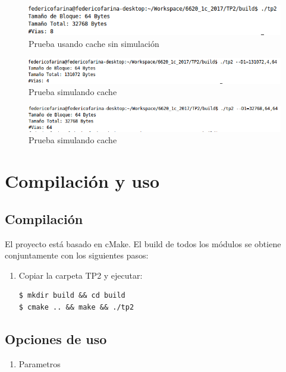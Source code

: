 \documentclass[a4paper,10pt]{article}
\begin{document}
\begin{figure}[h!]
	\centering
	\includegraphics[width=1.0\textwidth]{./pruebas/default.png}
	\caption{Prueba usando cache sin simulación}
    \label{fig:default}
\end{figure}


\begin{figure}[h!]
	\centering
	\includegraphics[width=1.0\textwidth]{./pruebas/D1_131072_4_64.png}
	\caption{Prueba simulando cache}
    \label{fig:default}
\end{figure}


\begin{figure}[h!]
	\centering
	\includegraphics[width=1.0\textwidth]{./pruebas/--D1_32768_64_64.png}
	\caption{Prueba simulando cache}
    \label{fig:default}
\end{figure}


\section{Compilación y uso}
\subsection{Compilación}

El proyecto está basado en cMake. El build de todos los módulos se obtiene conjuntamente con los siguientes pasos:

\begin{enumerate}
\item  Copiar la carpeta TP2 y ejecutar:
	\begin{verbatim}
$ mkdir build && cd build
$ cmake .. && make && ./tp2
	\end{verbatim}
\end{enumerate}

\subsection{Opciones de uso}
\begin{enumerate}
\item  Parametros
	\par
    \par
    \par
\end{enumerate}
\end{document}
